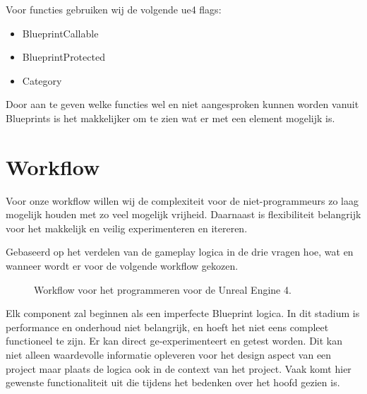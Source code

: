 Voor functies gebruiken wij de volgende \gls{ue4} flags:

\begin{itemize}
	\item BlueprintCallable
	\item BlueprintProtected
	\item Category
\end{itemize}

Door aan te geven welke functies wel en niet aangesproken kunnen worden vanuit Blueprints is het makkelijker om te zien wat er met een element mogelijk is.

\section{Workflow}
\label{ch:workflow}
Voor onze workflow willen wij de complexiteit voor de niet-programmeurs zo laag mogelijk houden met zo veel mogelijk vrijheid. Daarnaast is flexibiliteit belangrijk voor het makkelijk en veilig experimenteren en itereren.

Gebaseerd op het verdelen van de gameplay logica in de drie vragen hoe, wat en wanneer wordt er voor de volgende workflow gekozen.
    
\begin{figure}[H]
	\centering
	\caption{Workflow voor het programmeren voor de Unreal Engine 4.}
	\label{fig:workflow}
\end{figure}

Elk component zal beginnen als een imperfecte Blueprint logica. In dit stadium is performance en onderhoud niet belangrijk, en hoeft het niet eens compleet functioneel te zijn. Er kan direct ge-experimenteert en getest worden. Dit kan niet alleen waardevolle informatie opleveren voor het design aspect van een project maar plaats de logica ook in de context van het project. Vaak komt hier gewenste functionaliteit uit die tijdens het bedenken over het hoofd gezien is.

